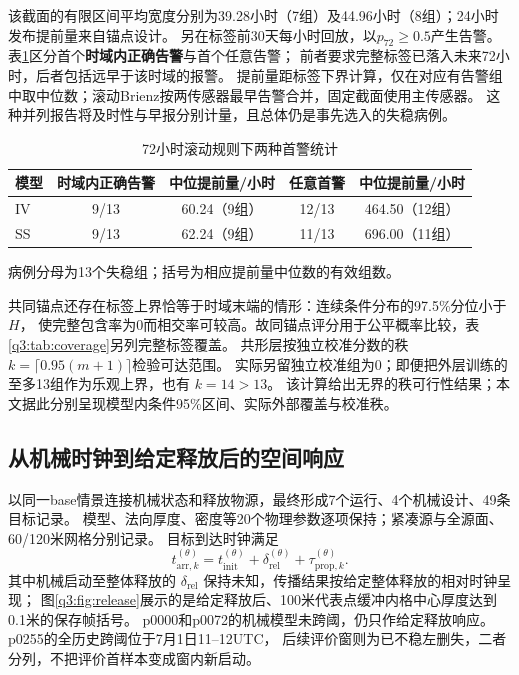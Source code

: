 该截面的有限区间平均宽度分别为39.28小时（7组）及44.96小时（8组）；24小时发布提前量来自锚点设计。
另在标签前30天每小时回放，以$p_{72}\ge0.5$产生告警。表\ref{q3:tab:lead}区分首个\textbf{时域内正确告警}与首个任意告警；
前者要求完整标签已落入未来72小时，后者包括远早于该时域的报警。
提前量距标签下界计算，仅在对应有告警组中取中位数；滚动Brienz按两传感器最早告警合并，固定截面使用主传感器。
这种并列报告将及时性与早报分别计量，且总体仍是事先选入的失稳病例。

\begin{table}[htbp]
 \centering\small
 \caption{72小时滚动规则下两种首警统计}\label{q3:tab:lead}
 \begin{tabular}{lcccc}
 \toprule
 模型&时域内正确告警&中位提前量/小时&任意首警&中位提前量/小时\\
 \midrule
 IV&9/13&60.24（9组）&12/13&464.50（12组）\\
 SS&9/13&62.24（9组）&11/13&696.00（11组）\\
 \bottomrule
 \end{tabular}
 \par\smallskip\footnotesize 病例分母为13个失稳组；括号为相应提前量中位数的有效组数。
\end{table}

共同锚点还存在标签上界恰等于时域末端的情形：连续条件分布的97.5\%分位小于 $H$，
使完整包含率为0而相交率可较高。故同锚点评分用于公平概率比较，表\ref{q3:tab:coverage}另列完整标签覆盖。
共形层按独立校准分数的秩 $k=\lceil0.95(m+1)\rceil$检验可达范围\cite{q3-angelopoulos2021}。
实际另留独立校准组为0；即便把外层训练的至多13组作为乐观上界，也有 $k=14>13$。
该计算给出无界的秩可行性结果；本文据此分别呈现模型内条件95\%区间、实际外部覆盖与校准秩。

\subsection{从机械时钟到给定释放后的空间响应}\label{q3:sec:arrival}
以同一base情景连接机械状态和释放物源，最终形成7个运行、4个机械设计、49条目标记录。
模型、法向厚度、密度等20个物理参数逐项保持；紧凑源与全源面、60/120米网格分别记录。
目标到达时钟满足
\begin{equation}
 t_{\mathrm{arr},k}^{(\theta)}=t_{\mathrm{init}}^{(\theta)}+\delta_{\mathrm{rel}}^{(\theta)}+\tau_{\mathrm{prop},k}^{(\theta)}.
 \label{q3:eq:arrival}
\end{equation}
其中机械启动至整体释放的 $\delta_{\mathrm{rel}}$ 保持未知，传播结果按给定整体释放的相对时钟呈现；
图\ref{q3:fig:release}展示的是给定释放后、100米代表点缓冲内格中心厚度达到0.1米的保存帧括号。
p0000和p0072的机械模型未跨阈，仍只作给定释放响应。p0255的全历史跨阈位于7月1日11--12UTC，
后续评价窗则为已不稳左删失，二者分列，不把评价首样本变成窗内新启动。

